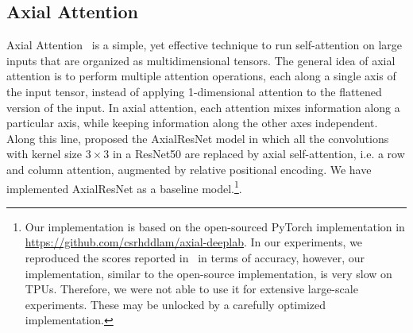 \subsection{Axial Attention}
Axial Attention~\citep{huang2020ccnet,ho2019-axialattention} is a simple, yet effective technique to run self-attention on large inputs that are organized as multidimensional tensors. The general idea of axial attention is to perform multiple attention operations, each along a single axis of the input tensor, instead of applying 1-dimensional attention to the flattened version of the input. In axial attention, each attention mixes information along a particular axis, while keeping information along the other axes independent. 
Along this line, \citet{wang2020axial} proposed the AxialResNet model in which all the convolutions with kernel size $3\times3$ in a ResNet50 are replaced by axial self-attention, i.e. a row and column attention, augmented by relative positional encoding. 
We have implemented AxialResNet as a baseline model.\footnote{Our implementation is based on the open-sourced PyTorch implementation in \url{https://github.com/csrhddlam/axial-deeplab}. In our experiments, we reproduced the scores reported in~\citep{wang2020axial} in terms of accuracy, however, our implementation, similar to the open-source implementation, is very slow on TPUs.
Therefore, we were not able to use it for extensive large-scale experiments.
These may be unlocked by a carefully optimized implementation.}.

